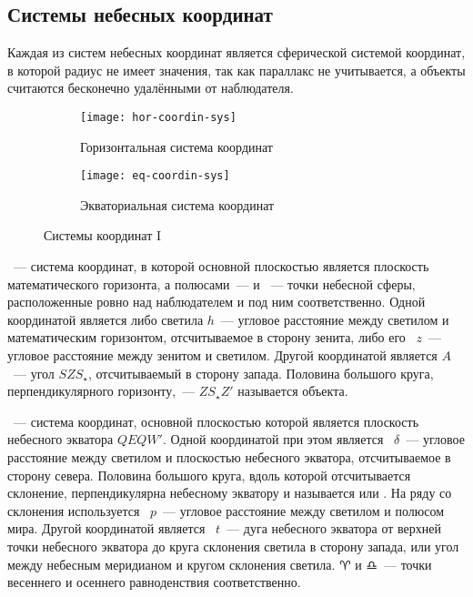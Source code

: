 \subsection{Системы небесных координат}
Каждая из систем небесных координат является сферической системой координат, в которой радиус не имеет значения, так как параллакс не учитывается, а объекты считаются бесконечно удалёнными от наблюдателя.

\begin{figure}[!h]
\centering
	\begin{subfigure}{0.49\textwidth}
		\texttt{[image: hor-coordin-sys]}
		\caption{Горизонтальная система координат}
	 \end{subfigure}
	 \hfill
	\begin{subfigure}{0.49\textwidth}
		\texttt{[image: eq-coordin-sys]}
		\caption{Экваториальная система координат}
	 \end{subfigure}
	\caption{Системы координат I}
\end{figure}
~--- система координат, в которой основной плоскостью является плоскость математического горизонта, а полюсами~---  и ~--- точки небесной сферы, расположенные ровно над наблюдателем и под ним соответственно. Одной координатой является либо  светила $h$~--- угловое расстояние между светилом и математическим горизонтом, отсчитываемое в сторону зенита, либо его ~$z$~--- угловое расстояние между зенитом и светилом. Другой координатой является  $A$~--- угол $SZS_\star$, отсчитываемый в сторону запада. Половина большого круга, перпендикулярного горизонту,~--- $Z S_\star Z'$  называется  объекта.

~--- система координат, основной плоскостью которой является плоскость небесного экватора $QEQW'$. Одной координатой при этом является ~$\delta$~--- угловое расстояние между светилом и плоскостью небесного экватора, отсчитываемое в сторону севера. Половина большого круга, вдоль которой отсчитывается склонение, перпендикулярна небесному экватору и называется  или . На ряду со склонения используется ~$p$~--- угловое расстояние между светилом и полюсом мира. Другой координатой является ~$t$~--- дуга небесного экватора от верхней точки небесного экватора до круга склонения светила в сторону запада, или угол между небесным меридианом и кругом склонения светила. $\aries$ и $\libra$~--- точки весеннего и осеннего равноденствия соответственно. 

